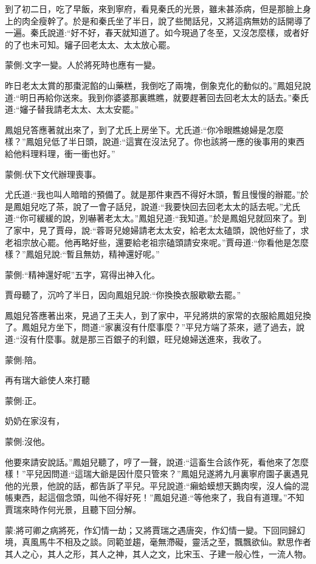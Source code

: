 \begin{parag}
    到了初二日，吃了早飯，來到寧府，看見秦氏的光景，雖未甚添病，但是那臉上身上的肉全瘦幹了。於是和秦氏坐了半日，說了些閒話兒，又將這病無妨的話開導了一遍。秦氏說道:“好不好，春天就知道了。如今現過了冬至，又沒怎麼樣，或者好的了也未可知。嬸子回老太太、太太放心罷。\begin{note}蒙側:文字一變。人於將死時也應有一變。\end{note}昨日老太太賞的那棗泥餡的山藥糕，我倒吃了兩塊，倒象克化的動似的。”鳳姐兒說道:“明日再給你送來。我到你婆婆那裏瞧瞧，就要趕著回去回老太太的話去。”秦氏道:“嬸子替我請老太太、太太安罷。”
\end{parag}


\begin{parag}
    鳳姐兒答應著就出來了，到了尤氏上房坐下。尤氏道:“你冷眼瞧媳婦是怎麼樣？”鳳姐兒低了半日頭，說道:“這實在沒法兒了。你也該將一應的後事用的東西給他料理料理，衝一衝也好。”\begin{note}蒙側:伏下文代辦理喪事。\end{note}尤氏道:“我也叫人暗暗的預備了。就是那件東西不得好木頭，暫且慢慢的辦罷。”於是鳳姐兒吃了茶，說了一會子話兒，說道:“我要快回去回老太太的話去呢。”尤氏道:“你可緩緩的說，別嚇著老太太。”鳳姐兒道:“我知道。”於是鳳姐兒就回來了。到了家中，見了賈母，說:“蓉哥兒媳婦請老太太安，給老太太磕頭，說他好些了，求老祖宗放心罷。他再略好些，還要給老祖宗磕頭請安來呢。”賈母道:“你看他是怎麼樣？”鳳姐兒說:“暫且無妨，精神還好呢。”\begin{note}蒙側:“精神還好呢”五字，寫得出神入化。\end{note}賈母聽了，沉吟了半日，因向鳳姐兒說:“你換換衣服歇歇去罷。”
\end{parag}


\begin{parag}
    鳳姐兒答應著出來，見過了王夫人，到了家中，平兒將烘的家常的衣服給鳳姐兒換了。鳳姐兒方坐下，問道:“家裏沒有什麼事麼？”平兒方端了茶來，遞了過去，說道:“沒有什麼事。就是那三百銀子的利銀，旺兒媳婦送進來，我收了。\begin{note}蒙側:陪。\end{note}再有瑞大爺使人來打聽\begin{note}蒙側:正。\end{note}奶奶在家沒有，\begin{note}蒙側:沒他。\end{note}他要來請安說話。”鳳姐兒聽了，哼了一聲，說道:“這畜生合該作死，看他來了怎麼樣！”平兒因問道:“這瑞大爺是因什麼只管來？”鳳姐兒遂將九月裏寧府園子裏遇見他的光景，他說的話，都告訴了平兒。平兒說道:“癩蛤蟆想天鵝肉喫，沒人倫的混帳東西，起這個念頭，叫他不得好死！”鳳姐兒道:“等他來了，我自有道理。”不知賈瑞來時作何光景，且聽下回分解。
\end{parag}


\begin{parag}
    \begin{note}蒙:將可卿之病將死，作幻情一劫；又將賈瑞之遇唐突，作幻情一變。下回同歸幻境，真風馬牛不相及之談。同範並趨，毫無滯礙，靈活之至，飄飄欲仙。默思作者其人之心，其人之形，其人之神，其人之文，比宋玉、子建一般心性，一流人物。\end{note}
\end{parag}
